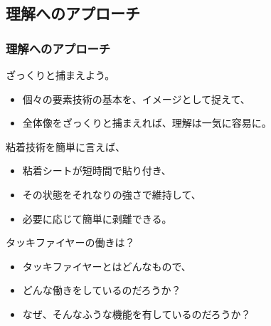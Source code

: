 \documentclass[unicode,12pt]{beamer}%
\begin{document}
\subsection{理解へのアプローチ}
\begin{frame}
	\frametitle{理解へのアプローチ}
	\vspace{-2mm}
	\begin{block}{ざっくりと捕まえよう。}
		\begin{itemize}
			\item 個々の要素技術の基本を、イメージとして捉えて、
			\item 全体像をざっくりと捕まえれば、理解は一気に容易に。
		\end{itemize}
	\end{block}
	
	\pause
	\vspace{-2mm}
	\begin{alertblock}{粘着技術を簡単に言えば、}
		\begin{itemize}
			\item 粘着シートが短時間で貼り付き、
			\item その状態をそれなりの強さで維持して、
			\item 必要に応じて簡単に剥離できる。
		\end{itemize}
	\end{alertblock}

	\pause
	\vspace{-2mm}
	\begin{exampleblock}{タッキファイヤーの働きは？}
		\begin{itemize}
			\item タッキファイヤーとはどんなもので、
			\item どんな働きをしているのだろうか？
			\item なぜ、そんなふうな機能を有しているのだろうか？
		\end{itemize}
	\end{exampleblock}

\end{frame}
\end{document}
